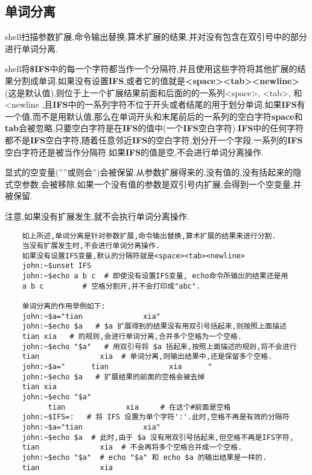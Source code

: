 \documentclass[draft,openany]{book}
\begin{document}
\begin{CJK}{UTF8}{gbsn}
    \subsection{单词分离}
    shell扫描参数扩展,命令输出替换,算术扩展的结果,并对没有包含在双引号中的部分进行单词分离.\par
    shell将\textbf{\$IFS}中的每一个字符都当作一个分隔符,并且使用这些字符将其他扩展的结果分割成单词.如果没有设置\textbf{IFS},或者它的值就是\textbf{\textless space\textgreater \textless tab\textgreater \textless newline\textgreater} (这是默认值),则位于上一个扩展结果前面和后面的的一系列\textless space\textgreater, \textless tab\textgreater, 和\textless newline ,且\textbf{IFS}中的一系列字符不位于开头或者结尾的用于划分单词.如果\textbf{IFS}有一个值,而不是用默认值,那么在单词开头和末尾前后的一系列的空白字符\textbf{space}和\textbf{tab}会被忽略,只要空白字符是在\textbf{IFS}的值中(一个\textbf{IFS}空白字符).\textbf{IFS}中的任何字符都不是\textbf{IFS}空白字符,随着任意邻近\textbf{IFS}的空白字符,划分开一个字段.一系列的\textbf{IFS}空白字符还是被当作分隔符.如果\textbf{IFS}的值是空,不会进行单词分离操作.\par
    显式的空变量(''''或则会'')会被保留.从参数扩展得来的,没有值的,没有括起来的隐式空参数,会被移除.如果一个没有值的参数是双引号内扩展,会得到一个空变量,并被保留.\par
    注意,如果没有扩展发生,就不会执行单词分离操作.
    \begin{verbatim}
    如上所述,单词分离是针对参数扩展,命令输出替换,算术扩展的结果来进行分割.
    当没有扩展发生时,不会进行单词分离操作.
    如果没有设置IFS变量,默认的分隔符就是<space><tab><newline>
    john:~$unset IFS
    john:~$echo a b c  # 即使没有设置IFS变量, echo命令所输出的结果还是用
    a b c         # 空格分割开,并不会打印成"abc".

    单词分离的作用举例如下:
    john:~$a="tian              xia"
    john:~$echo $a   # $a 扩展得到的结果没有用双引号括起来,则按照上面描述
    tian xia   # 的规则,会进行单词分离,合并多个空格为一个空格.
    john:~$echo "$a"   # 用双引号将 $a 括起来,按照上面描述的规则,将不会进行
    tian              xia  # 单词分离,则输出结果中,还是保留多个空格.
    john:~$a="      tian              xia      "
    john:~$echo $a   # 扩展结果的前面的空格会被去掉
    tian xia
    john:~$echo "$a"
          tian              xia     # 在这个#前面是空格
    john:~$IFS=:   # 将 IFS 设置为单个字符':'.此时,空格不再是有效的分隔符
    john:~$a="tian              xia"
    john:~$echo $a  # 此时,由于 $a 没有用双引号括起来,但空格不再是IFS字符,
    tian              xia  # 不会再将多个空格合并成一个空格.
    john:~$echo "$a"  # echo "$a" 和 echo $a 的输出结果是一样的.
    tian              xia
    \end{verbatim}


\end{CJK}
\end{document}
